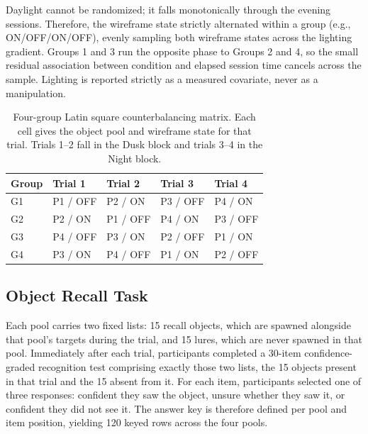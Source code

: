 Daylight cannot be randomized; it falls monotonically through the evening
sessions. Therefore, the wireframe state strictly alternated within a group
(e.g., ON/OFF/ON/OFF), evenly sampling both wireframe states across the
lighting gradient. Groups 1 and 3 run the opposite phase to Groups 2 and 4, so
the small residual association between condition and elapsed session time
cancels across the sample. Lighting is reported strictly as a measured
covariate, never as a manipulation.

\begin{table}[t]
  \caption{Four-group Latin square counterbalancing matrix. Each cell gives the
    object pool and wireframe state for that trial. Trials 1--2 fall in the
    Dusk block and trials 3--4 in the Night block.}
  \label{tab:counterbalance}
  \begin{tabular}{lllll}
    \toprule
    Group & Trial 1 & Trial 2 & Trial 3 & Trial 4\\
    \midrule
    G1 & P1 / OFF & P2 / ON  & P3 / OFF & P4 / ON\\
    G2 & P2 / ON  & P1 / OFF & P4 / ON  & P3 / OFF\\
    G3 & P4 / OFF & P3 / ON  & P2 / OFF & P1 / ON\\
    G4 & P3 / ON  & P4 / OFF & P1 / ON  & P2 / OFF\\
    \bottomrule
  \end{tabular}
\end{table}

\subsection{Object Recall Task}
\label{sec:recall}

Each pool carries two fixed lists: 15 recall objects, which are spawned
alongside that pool's targets during the trial, and 15 lures, which are never
spawned in that pool. Immediately after each trial, participants completed a
30-item confidence-graded recognition test comprising exactly those two lists,
the 15 objects present in that trial and the 15 absent from it. For each item,
participants selected one of three responses: confident they saw the object,
unsure whether they saw it, or confident they did not see it. The answer key
is therefore defined per pool and item position, yielding 120 keyed rows
across the four pools.

